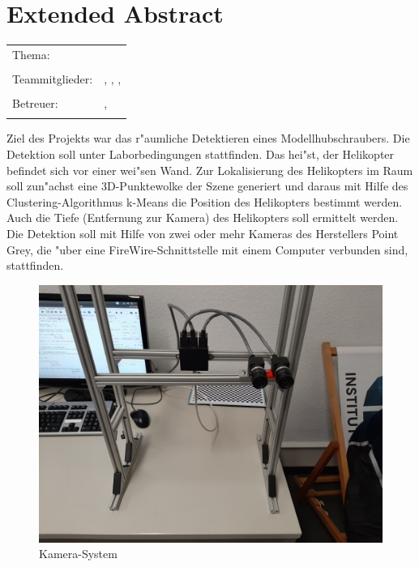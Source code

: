 \chapter*{Extended Abstract}

\begin{center}
	\begingroup
	\renewcommand*{\arraystretch}{1}
	{\makeatletter	
		\begin{tabular}{p{3.2cm}p{9.6cm}}
			Thema: & \thema \\
			& \\
			Teammitglieder: & \verfasserA, \verfasserB, 
			\verfasserC, \verfasserD\\
			& \\
			Betreuer: & \hoschschule \newline \institut \newline \prueferA, \prueferB \\
			& \\
		\end{tabular}
		
		\makeatother}
	\endgroup
\end{center}

\bigskip

\noindent
Ziel des Projekts war das r"aumliche Detektieren eines Modellhubschraubers. Die Detektion soll unter Laborbedingungen stattfinden. Das hei"st, der Helikopter befindet sich vor einer wei"sen Wand.
Zur Lokalisierung des Helikopters im Raum soll zun"achst eine 3D-Punktewolke der Szene generiert und daraus mit Hilfe des Clustering-Algorithmus k-Means die Position des Helikopters bestimmt werden. Auch die Tiefe (Entfernung zur Kamera) des Helikopters soll ermittelt werden. Die Detektion soll mit Hilfe von zwei oder mehr Kameras des Herstellers Point Grey, die "uber eine FireWire-Schnittstelle mit einem Computer verbunden sind, stattfinden.

\begin{figure}[H]
	\includegraphics[scale=0.3]{bilder/camerasystem}
	\caption[Kamera-System]{Kamera-System}
\end{figure}


